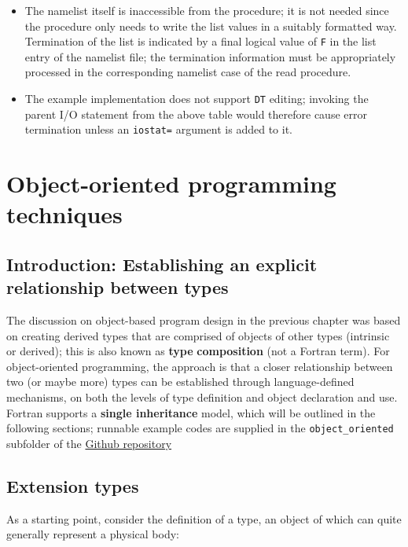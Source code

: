 \documentclass[
  paper=a4,
  ,captions=tableheading
]{scrartcl}
\providecommand{\tightlist}{%
  \setlength{\itemsep}{0pt}\setlength{\parskip}{0pt}}
\begin{document}
\begin{itemize}
\tightlist
\item
  The namelist itself is inaccessible from the procedure; it is not
  needed since the procedure only needs to write the list values in a
  suitably formatted way. Termination of the list is indicated by a
  final logical value of \texttt{F} in the list entry of the namelist
  file; the termination information must be appropriately processed in
  the corresponding namelist case of the read procedure.
\item
  The example implementation does not support \texttt{DT} editing;
  invoking the parent I/O statement from the above table would therefore
  cause error termination unless an \texttt{iostat=} argument is added
  to it.
\end{itemize}

\section{Object-oriented programming
techniques}\label{object-oriented-programming-techniques}

\subsection{Introduction: Establishing an explicit relationship between
types}\label{introduction-establishing-an-explicit-relationship-between-types}

The discussion on object-based program design in the previous chapter
was based on creating derived types that are comprised of objects of
other types (intrinsic or derived); this is also known as \textbf{type}
\textbf{composition} (not a Fortran term). For object-oriented
programming, the approach is that a closer relationship between two (or
maybe more) types can be established through language-defined
mechanisms, on both the levels of type definition and object declaration
and use. Fortran supports a \textbf{single inheritance} model, which
will be outlined in the following sections; runnable example codes are
supplied in the \texttt{object\_oriented} subfolder of the
\href{https://github.com/reinh-bader/object_fortran}{Github repository}

\subsection{Extension types}\label{extension-types}

As a starting point, consider the definition of a type, an object of
which can quite generally represent a physical body:
\end{document}
